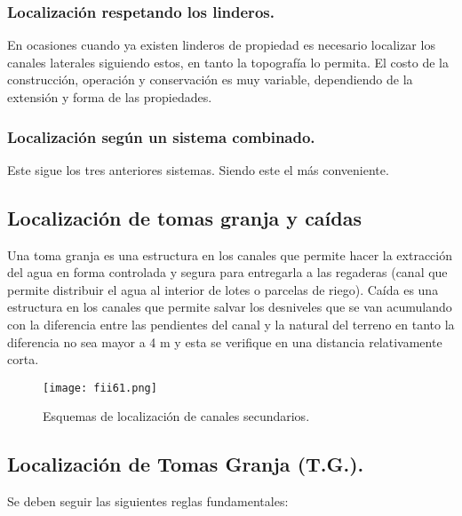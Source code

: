 \subsubsection{Localización respetando los linderos. }

En ocasiones cuando ya existen linderos de propiedad es necesario localizar los
canales laterales siguiendo estos, en tanto la topografía lo permita. El costo de la
construcción, operación y conservación es muy variable, dependiendo de la extensión y
forma de las propiedades.

\subsubsection{Localización según un sistema combinado.}

Este sigue los tres anteriores sistemas. Siendo este el más conveniente.

\subsection{Localización de tomas granja y caídas}

Una toma granja es una estructura en los canales que permite hacer la
extracción del agua en forma controlada y segura para entregarla a las regaderas (canal
que permite distribuir el agua al interior de lotes o parcelas de riego).
Caída es una estructura en los canales que permite salvar los desniveles que se
van acumulando con la diferencia entre las pendientes del canal y la natural del terreno
en tanto la diferencia no sea mayor a 4 m y esta se verifique en una distancia
relativamente corta.

\begin{figure}[h!]
	\centerline{\texttt{[image: fii61.png]}}
	\caption{Esquemas de localización de canales secundarios.}
	\label{fii61}
\end{figure}

\subsection{Localización de Tomas Granja (T.G.).}

Se deben seguir las siguientes reglas fundamentales:

